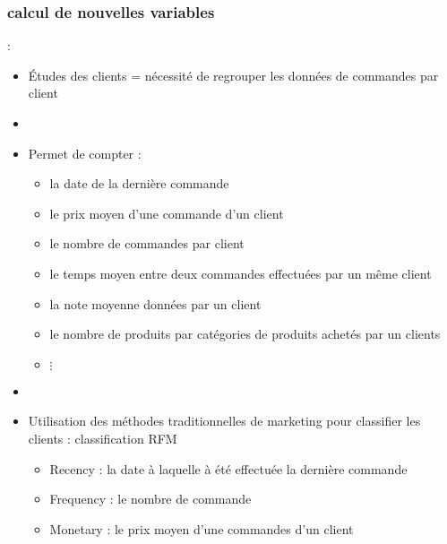 \documentclass[8pt,aspectratio=169,hyperref={unicode=true}]{beamer}
\begin{document}
\subsubsection{calcul de nouvelles variables}
\begin{frame}{\insertsection: \insertsubsection}
    \begin{itemize}
        \item Études des clients = nécessité de regrouper les données de commandes par client
        \item[]
        \item Permet de compter :
              \begin{itemize}
                  \item la date de la dernière commande
                  \item le prix moyen d'une commande d'un client
                  \item le nombre de commandes par client
                  \item le temps moyen entre deux commandes effectuées par un même client
                  \item la note moyenne données par un client
                  \item le nombre de produits par catégories de produits achetés par un clients
                  \item[] $\vdots$
              \end{itemize}
        \item[]
        \item Utilisation des méthodes traditionnelles de marketing pour classifier les clients : classification RFM
              \begin{itemize}
                  \item Recency : la date à laquelle à été effectuée la dernière commande
                  \item Frequency : le nombre de commande
                  \item Monetary : le prix moyen d'une commandes d'un client
              \end{itemize}
    \end{itemize}
\end{frame}
\end{document}
